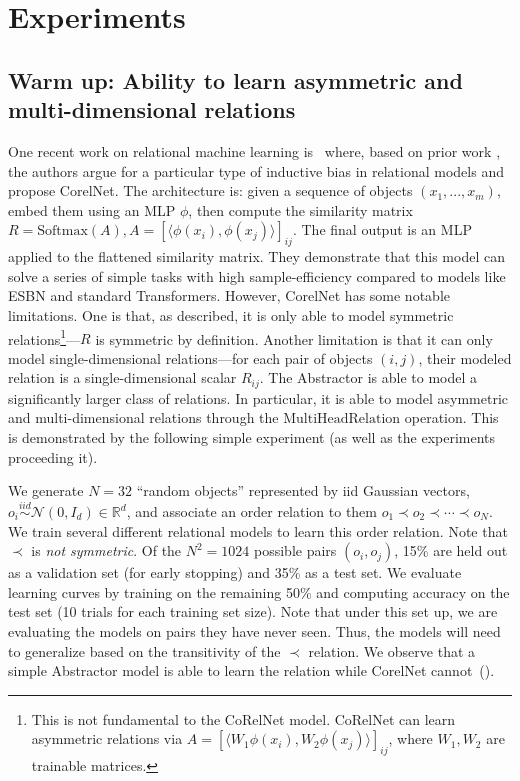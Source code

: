 
\section{Experiments}\label{sec:experiments}

\subsection{Warm up: Ability to learn asymmetric and multi-dimensional relations}
One recent work on relational machine learning is~\cite{kerg2022neural} where, based on prior work \cite{esbn}, the
authors argue for a particular type of inductive bias in relational models and propose CorelNet. The architecture is: given a sequence of objects $(x_1, ..., x_m)$, embed them using an MLP $\phi$, then compute the similarity matrix $R = \text{Softmax}(A), A = \left[\langle\phi(x_i), \phi(x_j)\rangle\right]_{ij}$. The final output is an MLP applied to the flattened similarity matrix. They demonstrate that this model can solve a series of simple tasks with high sample-efficiency compared to models like ESBN and standard Transformers. However, CorelNet has some notable limitations. One is that, as described,
it is only able to model symmetric relations\footnote{This is not fundamental to the CoRelNet model. CoRelNet can learn asymmetric relations via $A = \left[\langle W_1 \phi(x_i), W_2 \phi(x_j)\rangle\right]_{ij}$, where $W_1, W_2$ are trainable matrices.}---$R$ is symmetric by definition.
Another limitation is that it can only model single-dimensional relations---for each pair of objects $(i,j)$, their modeled relation is a single-dimensional scalar $R_{ij}$. The Abstractor is able to model a significantly larger class of relations. In particular, it is able to model asymmetric and multi-dimensional relations through the $\text{MultiHeadRelation}$ operation. This is demonstrated by the following simple experiment (as well as the experiments proceeding it).

We generate $N = 32$ ``random objects'' represented by iid Gaussian vectors, $o_i \overset{iid}{\sim} \mathcal{N}(0,
I_d) \in \mathbb{R}^d$, and associate an order relation to them $o_1 \prec o_2 \prec \cdots \prec o_N$. We train
several different relational models to learn this order relation. Note that $\prec$ is \textit{not symmetric}. Of the $N^2 = 1024$ possible pairs $(o_i, o_j)$, 15\% are held out as a validation set (for early stopping) and 35\% as a test set. We evaluate learning curves by training on the remaining 50\% and computing accuracy on the test set (10 trials for each training set size). Note that under this set up, we are evaluating the models on pairs they have never seen. Thus, the models will need to generalize based on the transitivity of the $\prec$ relation.
We observe that a simple Abstractor model is able to learn the relation while CorelNet cannot~().


